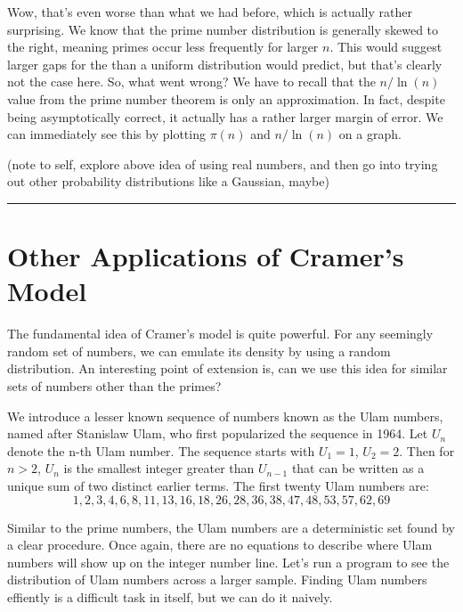 \documentclass[conference]{IEEEtran}
\begin{document}
Wow, that's even worse than what we had before, which is actually rather surprising.
We know that the prime number distribution is generally skewed to the right, meaning
primes occur less frequently for larger $n$. This would suggest larger gaps for the
than a uniform distribution would predict, but that's clearly not the case here. So,
what went wrong? We have to recall that the $n/\ln(n)$ value
from the prime number theorem is only an approximation. In fact, despite being
asymptotically correct, it actually has a rather larger margin of error. We
can immediately see this by plotting $\pi(n)$ and $n/\ln(n)$ on a graph.

(note to self, explore above idea of using real numbers, and then
go into trying out other probability distributions like a Gaussian, maybe)

\vspace{2mm}
\hrule
\vspace{2mm}


\section{Other Applications of Cramer's Model}

The fundamental idea of Cramer's model is quite powerful. For any seemingly random set of numbers, we can emulate its density by using a random distribution. An interesting point of extension is, can we use this idea for similar sets of numbers other than the primes?

We introduce a lesser known sequence of numbers known as the Ulam numbers, named after Stanislaw Ulam, who first popularized the sequence in 1964. Let $U_n$ denote the n-th Ulam number. The sequence starts with $U_1 = 1$, $U_2 = 2$. Then for $n > 2$, $U_n$ is the smallest integer greater than $U_{n - 1}$ that can be written as a unique sum of two distinct earlier terms. The first twenty Ulam numbers are:
\[1, 2, 3, 4, 6, 8, 11, 13, 16, 18, 26, 28, 36, 38, 47, 48, 53, 57, 62, 69\]

Similar to the prime numbers, the Ulam numbers are a deterministic set found by a clear procedure. Once again, there are no equations to describe where Ulam numbers will show up on the integer number line. Let's run a program to see the distribution of Ulam numbers across a larger sample. Finding Ulam numbers effiently is a difficult task in itself, but we can do it naively. 
\end{document}
